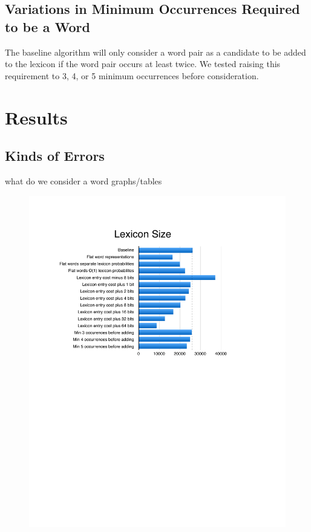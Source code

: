 \documentclass[11pt, oneside, fleqn]{article}
\begin{document}
	\subsection*{Variations in Minimum Occurrences Required to be a Word}
	
	The baseline algorithm will only consider a word pair as a candidate to be added to the lexicon if the word pair occurs at least twice. We tested raising this requirement to 3, 4, or 5 minimum occurrences before consideration.
 
   \section*{Results}
   
   \subsection*{Kinds of Errors}

  what do we consider a word
  graphs/tables
 
  \begin{figure}[h]
  \includegraphics{./figure/lexicon_size.pdf}
  \end{figure}
\end{document}

